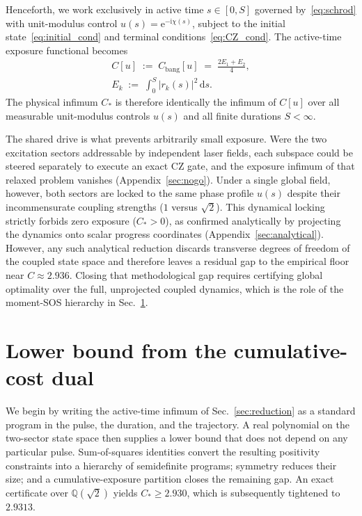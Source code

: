 \documentclass[aps,prx,reprint,nofootinbib,longbibliography,floatfix]{revtex4-2}
\theoremstyle{plain}
\theoremstyle{remark}
\newcommand{\dd}{\mathrm{d}}
\newcommand{\ee}{\mathrm{e}}
\newcommand{\ii}{\mathrm{i}}
\begin{document}
Henceforth, we work exclusively in active time $s \in [0, S]$ governed by~\eqref{eq:schrod} with unit-modulus control $u(s) = \ee^{-\ii\chi(s)}$, subject to the initial state~\eqref{eq:initial_cond} and terminal conditions~\eqref{eq:CZ_cond}. The active-time exposure functional becomes
\begin{equation}
\begin{gathered}
C[u] \;:=\; C_{\mathrm{bang}}[u] \;=\; \frac{2E_1+E_2}{4}, \\
E_k \;:=\; \int_0^S |r_k(s)|^2\,\dd s.
\end{gathered}
\label{eq:objective}
\end{equation}
The physical infimum $C_*$ is therefore identically the infimum of $C[u]$ over all measurable unit-modulus controls $u(s)$ and all finite durations $S < \infty$.

The shared drive is what prevents arbitrarily small exposure. Were the two excitation sectors addressable by independent laser fields, each subspace could be steered separately to execute an exact CZ gate, and the exposure infimum of that relaxed problem vanishes (Appendix~\ref{sec:nogo}). Under a single global field, however, both sectors are locked to the same phase profile $u(s)$ despite their incommensurate coupling strengths ($1$ versus $\sqrt{2}$). This dynamical locking strictly forbids zero exposure ($C_* > 0$), as confirmed analytically by projecting the dynamics onto scalar progress coordinates (Appendix~\ref{sec:analytical}). However, any such analytical reduction discards transverse degrees of freedom of the coupled state space and therefore leaves a residual gap to the empirical floor near $C \approx 2.936$. Closing that methodological gap requires certifying global optimality over the full, unprojected coupled dynamics, which is the role of the moment-SOS hierarchy in Sec.~\ref{sec:moments_sos}.

\section{Lower bound from the cumulative-cost dual}
\label{sec:moments_sos}

We begin by writing the active-time infimum of Sec.~\ref{sec:reduction} as a
standard program in the pulse, the duration, and the trajectory. A real
polynomial on the two-sector state space then supplies a lower bound that does
not depend on any particular pulse. Sum-of-squares identities convert the
resulting positivity constraints into a hierarchy of semidefinite programs;
symmetry reduces their size; and a cumulative-exposure partition closes the
remaining gap. An exact certificate over $\mathbb{Q}(\sqrt{2})$ yields
$C_*\ge2.930$, which is subsequently tightened to $2.9313$.
\end{document}
